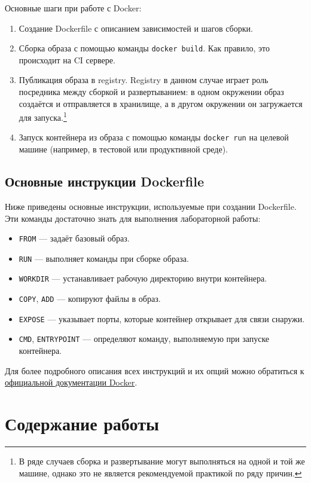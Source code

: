 \documentclass[12pt,a4paper]{article}
\begin{document}
Основные шаги при работе с Docker:
\begin{enumerate}
    \item Создание Dockerfile с описанием зависимостей и шагов сборки.
    \item Сборка образа с помощью команды \texttt{docker build}. Как правило, это происходит на CI сервере.
    \item Публикация образа в registry.
    Registry в данном случае играет роль посредника между сборкой и развертыванием: в одном окружении образ создаётся и отправляется в хранилище, а в другом окружении он загружается для запуска.\footnote{В ряде случаев сборка и развертывание могут выполняться на одной и той же машине, однако это не является рекомендуемой практикой по ряду причин.}
    \item Запуск контейнера из образа с помощью команды \texttt{docker run} на целевой машине (например, в тестовой или продуктивной среде).
\end{enumerate}

\subsection{Основные инструкции Dockerfile}

Ниже приведены основные инструкции, используемые при создании Dockerfile. Эти команды достаточно знать для выполнения лабораторной работы:

\begin{itemize}
    \item \texttt{FROM} — задаёт базовый образ.
    \item \texttt{RUN} — выполняет команды при сборке образа.
    \item \texttt{WORKDIR} — устанавливает рабочую директорию внутри контейнера.
    \item \texttt{COPY}, \texttt{ADD} — копируют файлы в образ.
    \item \texttt{EXPOSE} — указывает порты, которые контейнер открывает для связи снаружи.
    \item \texttt{CMD}, \texttt{ENTRYPOINT} — определяют команду, выполняемую при запуске контейнера.
\end{itemize}

Для более подробного описания всех инструкций и их опций можно обратиться к \href{https://docs.docker.com/engine/reference/builder/}{официальной документации Docker}.

\section{Содержание работы}
\end{document}
